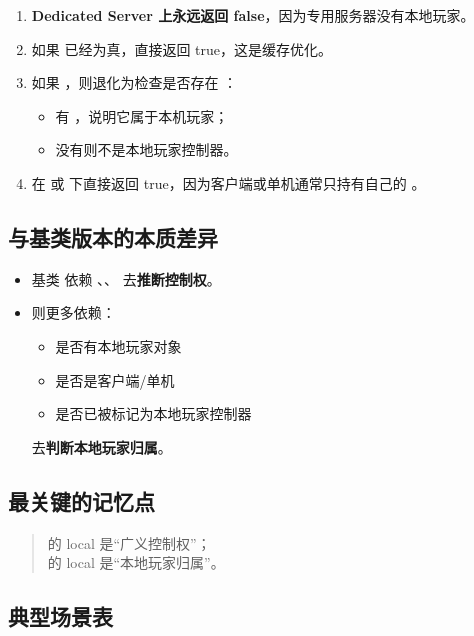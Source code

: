 \begin{enumerate}
	\item \textbf{Dedicated Server 上永远返回 false}，因为专用服务器没有本地玩家。
	\item 如果  已经为真，直接返回 true，这是缓存优化。
	\item 如果 ，则退化为检查是否存在 ：
	\begin{itemize}
		\item 有 ，说明它属于本机玩家；
		\item 没有则不是本地玩家控制器。
	\end{itemize}
	\item 在  或  下直接返回 true，因为客户端或单机通常只持有自己的 。
\end{enumerate}

\subsection{与基类版本的本质差异}

\begin{itemize}
	\item 基类  依赖 、、 去\textbf{推断控制权}。
	\item {} 则更多依赖：
	\begin{itemize}
		\item 是否有本地玩家对象 
		\item 是否是客户端/单机
		\item 是否已被标记为本地玩家控制器
	\end{itemize}
	去\textbf{判断本地玩家归属}。
\end{itemize}

\subsection{最关键的记忆点}

\begin{quote}
	 的 local 是“广义控制权”；\\
	 的 local 是“本地玩家归属”。
\end{quote}

\subsection{典型场景表}

